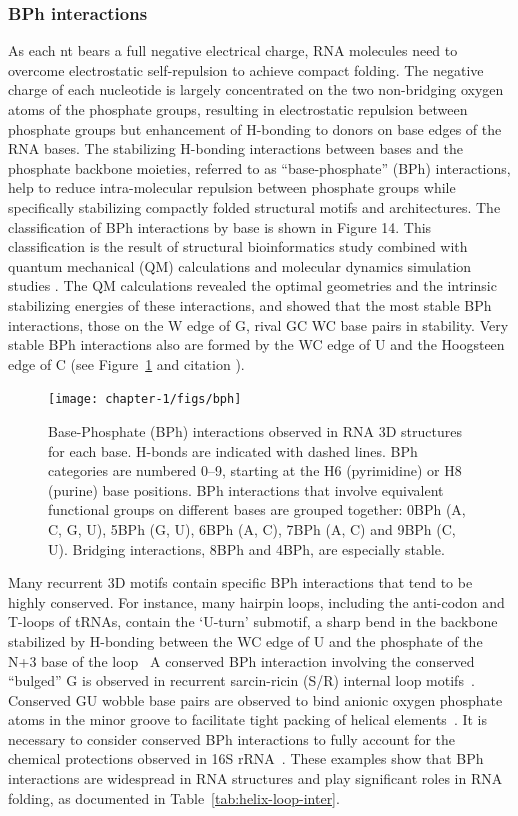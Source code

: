 \subsubsection{BPh interactions}

As each nt bears a full negative electrical charge, RNA molecules need to
overcome electrostatic self-repulsion to achieve compact folding. The negative
charge of each nucleotide is largely concentrated on the two non-bridging oxygen
atoms of the phosphate groups, resulting in electrostatic repulsion between
phosphate groups but enhancement of H-bonding to donors on base edges of the RNA
bases.  The stabilizing H-bonding interactions between bases and the phosphate
backbone moieties, referred to as ``base-phosphate'' (BPh) interactions, help to
reduce intra-molecular repulsion between phosphate groups while specifically
stabilizing compactly folded structural motifs and architectures. The
classification of BPh interactions by base is shown in Figure 14. This
classification is the result of structural bioinformatics study combined with
quantum mechanical (QM) calculations and molecular dynamics simulation studies
\cite{Zirbel2009, Zgarbova2011a}. The QM calculations revealed the optimal
geometries and the intrinsic stabilizing energies of these interactions, and
showed that the most stable BPh interactions, those on the W edge of G, rival GC
WC base pairs in stability. Very stable BPh interactions also are formed by the
WC edge of U and the Hoogsteen edge of C (see Figure~\ref{fig:bph} and citation
\cite{Zirbel2009}).

\begin{figure}
  \texttt{[image: chapter-1/figs/bph]}
  \caption{Base-Phosphate (BPh) interactions observed in RNA 3D structures for
    each base. H-bonds are indicated with dashed lines. BPh categories are
    numbered 0–9, starting at the H6 (pyrimidine) or H8 (purine) base positions.
    BPh interactions that involve equivalent functional groups on different
    bases are grouped together: 0BPh (A, C, G, U), 5BPh (G, U), 6BPh (A, C),
    7BPh (A, C) and 9BPh (C, U). Bridging interactions, 8BPh and 4BPh, are
  especially stable.}
\label{fig:bph}
\end{figure}

Many recurrent 3D motifs contain specific BPh interactions that tend to be
highly conserved. For instance, many hairpin loops, including the anti-codon and
T-loops of tRNAs, contain the ‘U-turn' submotif, a sharp bend in the backbone
stabilized by H-bonding between the WC edge of U and the phosphate of the N+3
base of the loop~\cite{Quigley1976} A conserved BPh interaction involving the
conserved ``bulged'' G is observed in recurrent sarcin-ricin (S/R) internal loop
motifs~\cite{Correll1998}. Conserved GU wobble base pairs are observed to bind
anionic oxygen phosphate atoms in the minor groove to facilitate tight packing
of helical elements~\cite{Mokdad2006b}. It is necessary to consider conserved
BPh interactions to fully account for the chemical protections observed in 16S
rRNA~\cite{Merryman1999, Stern1988}. These examples show that BPh interactions
are widespread in RNA structures and play significant roles in RNA folding, as
documented in Table~\ref{tab:helix-loop-inter}.

